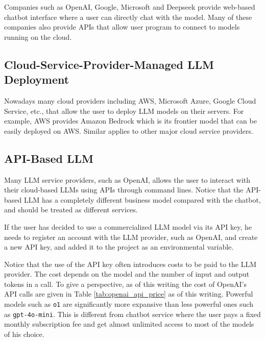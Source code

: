 Companies such as OpenAI, Google, Microsoft and Deepseek provide web-based chatbot interface where a user can directly chat with the model. Many of these companies also provide APIs that allow user program to connect to models running on the cloud.

\subsection{Cloud-Service-Provider-Managed LLM Deployment}

Nowadays many cloud providers including AWS, Microsoft Azure, Google Cloud Service, etc., that allow the user to deploy LLM models on their servers. For example, AWS provides Amazon Bedrock which is its frontier model that can be easily deployed on AWS. Similar applies to other major cloud service providers.

\subsection{API-Based LLM}

Many LLM service providers, such as OpenAI, allows the user to interact with their cloud-based LLMs using APIs through command lines. Notice that the API-based LLM has a completely different business model compared with the chatbot, and should be treated as different services.

If the user has decided to use a commercialized LLM model via its API key, he needs to register an account with the LLM provider, such as OpenAI, and create a new API key, and added it to the project as an environmental variable. 

Notice that the use of the API key often introduces costs to be paid to the LLM provider. The cost depends on the model and the number of input and output tokens in a call. To give a perspective, as of this writing the cost of OpenAI's API calls are given in Table \ref{tab:openai_api_price} as of this writing. Powerful models such as \texttt{o1} are significantly more expansive than less powerful ones such as \texttt{gpt-4o-mini}. This is different from chatbot service where the user pays a fixed monthly subscription fee and get almost unlimited access to most of the models of his choice.

